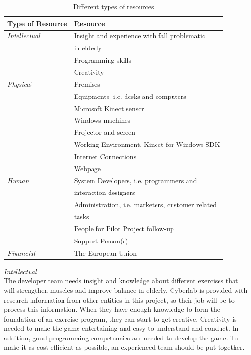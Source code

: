 \begin{table}
\centering
    \begin{tabular}{|l|l|}
        \hline
       \textbf{Type of Resource} & \textbf{Resource}  \\ \hline
       \emph{Intellectual} & Insight and experience with fall problematic \\ & in elderly \\ \cline{2-2}
        & Programming skills \\ \cline{2-2}
	 	& Creativity \\ \hline
	   \emph{Physical} & Premises \\ \cline{2-2}
	   	& Equipments, i.e. desks and computers  \\ \cline{2-2}
	   	& Microsoft Kinect sensor \\ \cline{2-2}
	   	& Windows machines \\ \cline{2-2}
	   	& Projector and screen \\ \cline{2-2}
	   	& Working Environment, Kinect for Windows SDK \\ \cline{2-2}
	   	& Internet Connections \\ \cline{2-2}
	   	& Webpage \\ \hline
	   \emph{Human} & System Developers, i.e. programmers and \\ & interaction designers \\ \cline{2-2}
	   	& Administration, i.e. marketers, customer related \\ &tasks \\ \cline{2-2}
	   	&  People for Pilot Project follow-up \\ \cline{2-2}
	   	& Support Person(s) \\ \hline
	   \emph{Financial} & The European Union \\
        \hline
    \end{tabular}
    \caption[Resources]{Different types of resources}
    \label{tab:Resources}
\end{table} 
\emph{Intellectual} \\ The developer team needs insight and knowledge about different exercises that will strengthen muscles and improve balance in elderly. Cyberlab is provided with research information from other entities in this project, so their job will be to process this information. When they have enough knowledge to form the foundation of an exercise program, they can start to get creative. Creativity is needed to make the game entertaining and easy to understand and conduct. In addition, good programming competencies are needed to develop the game. To make it as cost-efficient as possible, an experienced team should be put together. \\ \\

